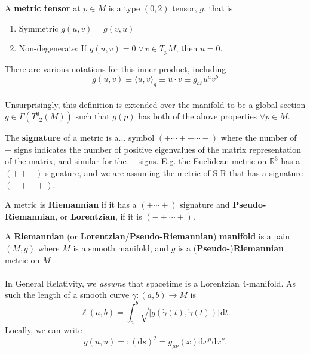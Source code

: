 \documentclass[11pt,fleqn]{report}
\begin{document}
\begin{definition}
A \textbf{metric tensor} at $p\in M$ is a type $(0,2)$ tensor, $g$, that is \begin{enumerate}
\item Symmetric $g(u,v)=g(v,u)$
\item Non-degenerate: If $g(u,v)=0 \; \forall \, v \in T_pM$, then $u=0$.
\end{enumerate}
\end{definition}

\begin{remark}
There are various notations for this inner product, including \begin{equation}
g(u,v) \equiv \langle u,v \rangle_g \equiv u \cdot v \equiv g_{ab}u^av^b
\end{equation}
\end{remark}

\paragraph{} Unsurprisingly, this definition is extended over the manifold to be a global section $g\in \Gamma\left(T^0_{\phantom 0 2}(M)\right)$ such that $g(p)$ has both of the above properties $\forall p \in M$.

\begin{definition}
The \textbf{signature} of a metric is a... symbol $(+\cdots + - \cdots -)$ where the number of $+$ signs indicates the number of positive eigenvalues of the matrix representation of the matrix, and similar for the $-$ signs. E.g. the Euclidean metric on $\mathbb{R}^3$ has a $(+++)$ signature, and we are assuming the metric of S-R that has a signature $(-+++)$.

A metric is \textbf{Riemannian} if it has a $(+\cdots+)$ signature and \textbf{Pseudo-Riemannian}, or \textbf{Lorentzian}, if it is $(-+\cdots +)$.
\end{definition}

\begin{definition}
A \textbf{Riemannian} (or \textbf{Lorentzian}/\textbf{Pseudo-Riemannian}) \textbf{manifold} is a pain $(M,g)$ where $M$ is a smooth manifold, and $g$ is a (\textbf{Pseudo-})\textbf{Riemannian} metric on $M$
\end{definition}

\paragraph{} In General Relativity, we \textit{assume} that spacetime is a Lorentzian 4-manifold. As such the length of a smooth curve $\gamma:(a,b) \to M$ is \begin{equation}
\ell(a,b) = \int_a^b \sqrt{|g(\dot{\gamma}(t),\dot{\gamma}(t))|}\mathrm{d}t.
\end{equation}
Locally, we can write\begin{equation}
g(u,u) =: (\mathrm{d}s)^2 = g_{\mu\nu}(x)\mathrm{d}x^\mu\mathrm{d}x^\nu.
\end{equation}
\end{document}
